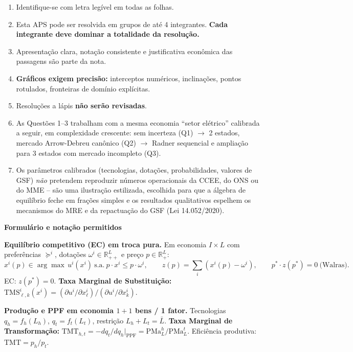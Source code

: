 \documentclass[11pt,addpoints]{exam}
\newcommand{\TMS}{\text{TMS}}
\newcommand{\TMT}{\text{TMT}}
\begin{document}
    \begin{enumerate}[noitemsep]
        \item Identifique-se com letra legível em todas as folhas.
        \item Esta APS pode ser resolvida em grupos de até 4 integrantes. \textbf{Cada integrante deve dominar a totalidade da resolução.}
        \item Apresentação clara, notação consistente e justificativa econômica das passagens são parte da nota.
        \item \textbf{Gráficos exigem precisão:} interceptos numéricos, inclinações, pontos rotulados, fronteiras de domínio explícitas.
        \item Resoluções a lápis \textbf{não serão revisadas}.
        \item As Questões 1--3 trabalham com a mesma economia ``setor elétrico'' calibrada a seguir, em complexidade crescente: sem incerteza (Q1) $\to$ 2 estados, mercado Arrow-Debreu canônico (Q2) $\to$ Radner sequencial e ampliação para 3 estados com mercado incompleto (Q3).
        \item Os parâmetros calibrados (tecnologias, dotações, probabilidades, valores de GSF) \textit{não} pretendem reproduzir números operacionais da CCEE, do ONS ou do MME -- são uma ilustração estilizada, escolhida para que a álgebra de equilíbrio feche em frações simples e os resultados qualitativos espelhem os mecanismos do MRE e da repactuação do GSF (Lei 14.052/2020).
    \end{enumerate}


    \vspace{0.5em}
    \noindent\hrulefill

    \noindent\textbf{Formulário e notação permitidos}
    \vspace{0.3em}

    \textbf{Equilíbrio competitivo (EC) em troca pura.} Em economia $I \times L$ com preferências $\succeq^i$, dotações $\omega^i \in \mathbb{R}^L_{++}$ e preço $p \in \mathbb{R}^L_+$:
    \[
        x^i(p) \in \arg\max\, u^i(x^i)\ \text{s.a.}\ p\cdot x^i \leq p\cdot \omega^i,\qquad
        z(p) = \sum_i (x^i(p) - \omega^i),\qquad p^*\cdot z(p^*) = 0\ \text{(Walras).}
    \]
    EC: $z(p^*) = 0$. \textbf{Taxa Marginal de Substituição:} $\TMS^i_{\ell, k}(x^i) = (\partial u^i/\partial x^i_\ell)/(\partial u^i/\partial x^i_k)$.

    \textbf{Produção e PPF em economia $1+1$ bens / 1 fator.} Tecnologias $q_h = f_h(L_h)$, $q_t = f_t(L_t)$, restrição $L_h + L_t = \bar L$. \textbf{Taxa Marginal de Transformação:} $\TMT_{h,t} = -dq_t/dq_h\big|_{\text{PPF}} = \mathrm{PMa}_L^{h}/\mathrm{PMa}_L^{t}$. Eficiência produtiva: $\TMT = p_h/p_t$.
\end{document}
